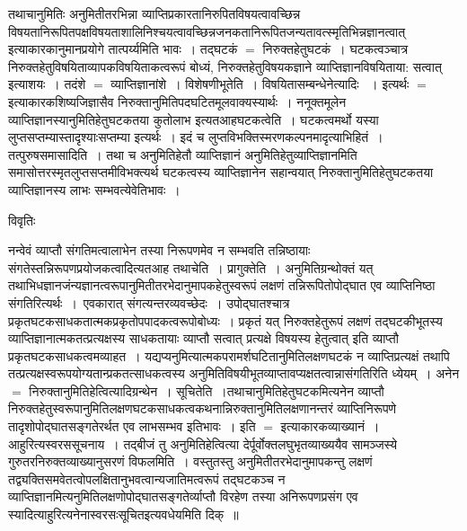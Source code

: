 \documentclass[10pt, openany]{book}
\begin{document}
{तथाचानुमितिः अनुमितीतरभिन्ना व्याप्तिप्रकारतानिरुपितविषयत्वावच्छिन्न विषयतानिरूपितपक्षविषयताशालिनिश्चयत्वावच्छिन्नजनकतानिरूपितजन्यतावत्स्मृतिभिन्नज्ञानत्वात् इत्याकारकानुमानप्रयोगे तात्पर्य्यमिति भावः~। तद्घटकं $=$ निरुक्तहेतुघटकं~। घटकत्वञ्चात्र निरुक्तहेतुविषयिताव्यापकविषयिताकत्वरूपं बोध्यं, निरुक्तहेतुविषयकज्ञाने व्याप्तिज्ञानविषयिताया: सत्वात् इत्याशयः~। तदंशे $=$ व्याप्तिज्ञानांशे~। विशेषणीभूतेति~। विषयितासम्बन्धेनेत्यादिः ~। इत्यर्थः $=$ इत्याकारकशिष्यजिज्ञासैव निरुक्तानुमितिपदघटितमूलवाक्यस्यार्थः~। ननूक्तमूलेन व्याप्तिज्ञानस्यानुमितिहेतुघटकतया कुतोलाभ इत्यतआह\textendash घटकत्वेति~। घटकत्वमर्थो यस्या लुप्तसप्तम्यास्तादृश्याःसप्तम्या इत्यर्थः~। इदं च लुप्तविभक्तिस्मरणकल्पनमादृत्याभिहितं~। {\la तत्पुरुषसमासादिति~।} तथा च अनुमितिहेतौ व्याप्तिज्ञानं अनुमितिहेतुव्याप्तिज्ञानमिति समासोत्तरस्मृतलुप्तसप्तमीविभक्त्यर्थ  घटकत्वस्य व्याप्तिज्ञानेन सहान्वयात् निरुक्तानुमितिहेतुघटकतया व्याप्तिज्ञानस्य लाभः सम्भवत्येवेतिभावः~।

\newpage
\begin{center}     विवृतिः \end{center}

नन्वेवं व्याप्तौ संगतिमत्वालाभेन तस्या निरूपणमेव न सम्भवति तन्निष्ठायाः संगतेस्तन्निरूपणप्रयोजकत्वादित्यतआह तथाचेति~। {\la प्रागुक्तेति~।} अनुमितिग्रन्थोक्तं यत्
तथाभिधज्ञानजंन्यज्ञानत्वरूपानुमितीतरभेदानुमापकहेतुस्वरूपं लक्षणं तन्निरूपितोपोद्घात एव व्याप्तिनिष्ठा संगतिरित्यर्थः~।~एवकारात् संगत्यन्तरव्यवच्छेदः~। उपोद्घातश्चात्र प्रकृतघटकसाधकतात्मकप्रकृतोपपादकत्वरूपोबोध्यः~। प्रकृतं यत् निरुक्तहेतुरूपं लक्षणं तद्घटकीभूतस्य व्याप्तिज्ञानात्मकतत्प्रत्यक्षस्य साधकतायाः व्याप्तौ सत्वात् प्रत्यक्षे विषयस्य हेतुत्वात् इति व्याप्तौ प्रकृतघटकसाधकत्वमव्याहत~। यद्यप्यनुमित्यात्मकपरामर्शघटितानुमितिलक्षणघटकं न व्याप्तिप्रत्यक्षं तथापि तत्प्रत्यक्षस्वरूपयोग्यतान्प्रकतत्साधकत्वस्य अनुमितिविषयीभूतव्याप्तावप्यक्षतत्वान्नासंगतिरिति ध्येयम्~। अनेन $=$ निरुक्तानुमितिहेत्वित्यादिग्रन्थेन~। सूचितेति~।तथाचानुमितिहेतुघटकमित्यनेन व्याप्तौ निरुक्तहेतुस्वरूपानुमितिलक्षणघटकसाधकत्वकथनान्निरुक्तानुमितिलक्षणानन्तरं व्याप्तिनिरूपणे तादृशोपोद्घातसङ्गतेरर्थत एव लाभसम्भव इतिभावः~। इति $=$ इत्याकारकव्याख्यानं~। आहुरित्यस्वरससूचनाय~। तद्बीजं तु अनुमितिहेत्वित्या देर्पूर्वोक्तलघुभृतव्याख्ययैव सामञ्जस्ये गुरुतरनिरुक्तव्याख्यानुसरणं विफलमिति~। वस्तुतस्तु अनुमितीतरभेदानुमापकन्तु लक्षणं तद्व्यक्तिसमवेतत्वोपलक्षितानुभवत्वान्यजातिमत्वरूपं तद्घटकञ्च न
व्याप्तिज्ञानमित्यनुमितिलक्षणोपोद्घातसङ्गतेर्व्याप्तौ विरहेण तस्या अनिरूपणप्रसंग एव स्यादित्याहुरित्यनेनास्वरसःसूचितइत्यवधेयमिति दिक्~॥\\

}
\end{document}
